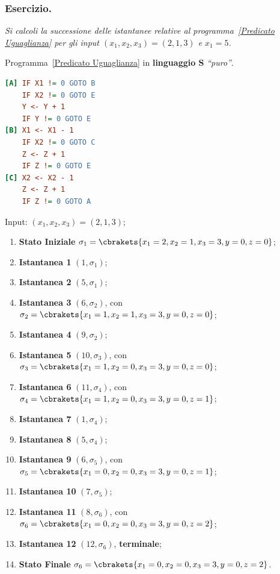\subsubsection*{Esercizio.} \textit{Si calcoli la successione delle istantanee relative al programma~\ref{Predicato Uguaglianza} per gli input \((x_1,x_2,x_3)=(2,1,3)\) e \(x_1=5\).}

Programma~\ref{Predicato Uguaglianza} in \textbf{linguaggio S} \textit{``puro''}.

\begin{lstlisting}[language=ini, caption=Predicato di Uguaglianza senza Macro, label={Predicato Uguaglianza noMacro}]
[A] IF X1 != 0 GOTO B
    IF X2 != 0 GOTO E
    Y <- Y + 1
    IF Y != 0 GOTO E
[B] X1 <- X1 - 1
    IF X2 != 0 GOTO C
    Z <- Z + 1
    IF Z != 0 GOTO E
[C] X2 <- X2 - 1
    Z <- Z + 1
    IF Z != 0 GOTO A
\end{lstlisting}

Input: \((x_1,x_2,x_3)=(2,1,3)\);

\begin{enumerate}
    \item \textbf{Stato Iniziale} \(\sigma_1=\cbrakets{x_1=2,x_2=1,x_3=3,y=0,z=0}\);
    \item \textbf{Istantanea 1} \((1,\sigma_1)\);
    \item \textbf{Istantanea 2} \((5,\sigma_1)\);
    \item \textbf{Istantanea 3} \((6,\sigma_2)\), con \(\sigma_2=\cbrakets{x_1=1,x_2=1,x_3=3,y=0,z=0}\);
    \item \textbf{Istantanea 4} \((9,\sigma_2)\);
    \item \textbf{Istantanea 5} \((10,\sigma_3)\), con \(\sigma_3=\cbrakets{x_1=1,x_2=0,x_3=3,y=0,z=0}\);
    \item \textbf{Istantanea 6} \((11,\sigma_4)\), con \(\sigma_4=\cbrakets{x_1=1,x_2=0,x_3=3,y=0,z=1}\);
    \item \textbf{Istantanea 7} \((1,\sigma_4)\);
    \item \textbf{Istantanea 8} \((5,\sigma_4)\);
    \item \textbf{Istantanea 9} \((6,\sigma_5)\), con \(\sigma_5=\cbrakets{x_1=0,x_2=0,x_3=3,y=0,z=1}\);
    \item \textbf{Istantanea 10} \((7,\sigma_5)\);
    \item \textbf{Istantanea 11} \((8,\sigma_6)\), con \(\sigma_6=\cbrakets{x_1=0,x_2=0,x_3=3,y=0,z=2}\);
    \item \textbf{Istantanea 12} \((12,\sigma_6)\), \textbf{terminale};
    \item \textbf{Stato Finale} \(\sigma_6=\cbrakets{x_1=0,x_2=0,x_3=3,y=0,z=2}\).
\end{enumerate}

